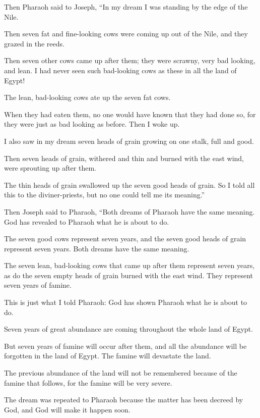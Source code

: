 \begin{scripture}
 Then Pharaoh said to Joseph, ``In my dream I was standing by the edge of the Nile.
 Then seven fat and fine-looking cows were coming up out of the Nile, and they grazed in the reeds.
 Then seven other cows came up after them; they were scrawny, very bad looking, and lean. I had never seen such bad-looking cows as these in all the land of Egypt!
 The lean, bad-looking cows ate up the seven fat cows.
 When they had eaten them, no one would have known that they had done so, for they were just as bad looking as before. Then I woke up.
 I also saw in my dream seven heads of grain growing on one stalk, full and good.
 Then seven heads of grain, withered and thin and burned with the east wind, were sprouting up after them.
 The thin heads of grain swallowed up the seven good heads of grain. So I told all this to the diviner-priests, but no one could tell me its meaning.''
\everypar{}

 Then Joseph said to Pharaoh, ``Both dreams of Pharaoh have the same meaning. God has revealed to Pharaoh what he is about to do.
 The seven good cows represent seven years, and the seven good heads of grain represent seven years. Both dreams have the same meaning.
 The seven lean, bad-looking cows that came up after them represent seven years, as do the seven empty heads of grain burned with the east wind. They represent seven years of famine.
 This is just what I told Pharaoh: God has shown Pharaoh what he is about to do.
 Seven years of great abundance are coming throughout the whole land of Egypt.
 But seven years of famine will occur after them, and all the abundance will be forgotten in the land of Egypt. The famine will devastate the land.
 The previous abundance of the land will not be remembered because of the famine that follows, for the famine will be very severe.
 The dream was repeated to Pharaoh because the matter has been decreed by God, and God will make it happen soon.
\everypar{}


\end{scripture}
